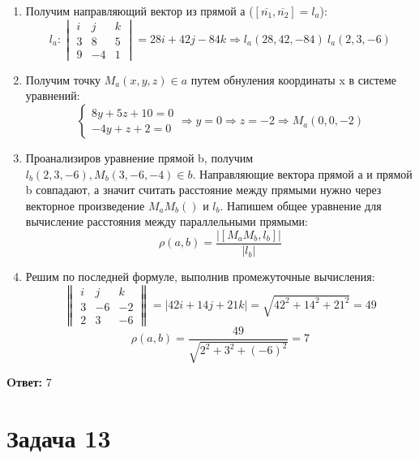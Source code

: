 \documentclass{article}
\begin{document}
\begin{enumerate}
  \item Получим направляющий вектор из прямой а ($[\overline{n_1},\overline{n_2}] = l_a$):
    \[
      l_a: 
      \begin{vmatrix}
        i &j &k \\ 
        3 &8 &5\\ 
        9 &-4 &1
      \end{vmatrix}
    = 28i + 42j -84k \Rightarrow l_a(28,42,-84)~ l_a(2,3,-6)\]
  \item Получим точку $M_a(x,y,z) \in a$ путем обнуления координаты x в системе уравнений:
    \[
      \begin{cases}
        8y + 5z + 10 = 0\\ 
        -4y + z + 2 = 0 
      \end{cases}
    \Rightarrow y = 0 \Rightarrow z = -2 \Rightarrow M_a(0,0,-2)\]
  \item Проанализиров уравнение прямой b, получим $l_b(2,3,-6), M_b(3,-6,-4) \in b$. Направляющие
    вектора прямой а и прямой b совпадают, а значит считать расстояние между прямыми нужно через 
    векторное произведение $M_aM_b()$ и $l_b$. Напишем общее уравнение для вычисление расстояния между
    параллельными прямыми:
    \[
      \rho(a,b) = \frac{|[M_aM_b, l_b]|}{|l_b|} 
    \]
  \item Решим по последней формуле, выполнив промежуточные вычисления:
    \[
      \begin{Vmatrix}
        i &j &k\\ 
        3 &-6 &-2\\ 
        2 &3 &-6
      \end{Vmatrix} = |42i + 14j + 21k| = \sqrt{42^2 + 14^2 + 21^2} = 49\]\[
      \rho(a,b) = \frac{49}{\sqrt{2^2+3^2+(-6)^2}} = 7 
    \]
\end{enumerate}

\textbf{Oтвет: }7


\section*{Задача 13}
\end{document}
